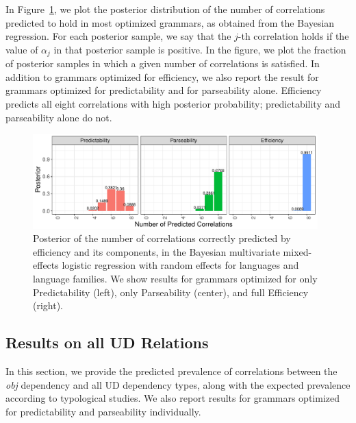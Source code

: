 \documentclass[10pt,twoside,lineno]{article}
\begin{document}
In Figure~\ref{fig:posterior}, we plot the posterior distribution of the number of correlations predicted to hold in most optimized grammars, as obtained from the Bayesian regression.
For each posterior sample, we say that the $j$-th correlation holds if the value of $\alpha_j$ in that posterior sample is positive.
In the figure, we plot the fraction of posterior samples in which a given number of correlations is satisfied.
In addition to grammars optimized for efficiency, we also report the result for grammars optimized for predictability and for parseability alone.
Efficiency predicts all eight correlations with high posterior probability; predictability and parseability alone do not.

\begin{figure}[ht]
	\begin{center}
	\includegraphics[width=0.98\textwidth]{../results/correlations/figures/posterior-satisfied-universals-together-large-three.pdf}
	\end{center}
	\caption{Posterior of the number of correlations correctly predicted by efficiency and its components, in the Bayesian multivariate mixed-effects logistic regression with random effects for languages and language families. We show results for grammars optimized for only Predictability (left), only Parseability (center), and full Efficiency (right).}\label{fig:posterior}
\end{figure}




\subsection{Results on all UD Relations}
In this section, we provide the predicted prevalence of correlations between the \emph{obj} dependency and all UD dependency types, along with the expected prevalence according to typological studies.
We also report results for grammars optimized for predictability and parseability individually.
\end{document}
